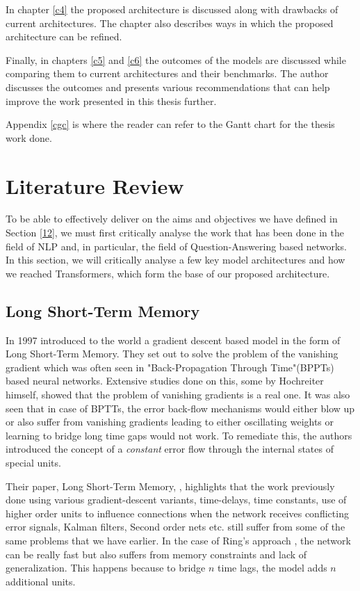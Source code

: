 \documentclass[a4paper,12pt]{report}
\begin{document}
        
        In chapter \ref{c4} the proposed architecture is discussed along with drawbacks of current architectures. The chapter also describes ways in which the proposed architecture can be refined. 
        
        Finally, in chapters \ref{c5} and \ref{c6} the outcomes of the models are discussed while comparing them to current architectures and their benchmarks. The author discusses the outcomes and presents various recommendations that can help improve the work presented in this thesis further.         
        
        Appendix \ref{cgc} is where the reader can refer to the Gantt chart for the thesis work done.

    \chapter{Literature Review}\label{c2litrev}

    To be able to effectively deliver on the aims and objectives we have defined in Section \ref{12}, we must first critically analyse the work that has been done in the field of NLP and, in particular, the field of Question-Answering based networks. In this section, we will critically analyse a few key model architectures and how we reached Transformers, which form the base of our proposed architecture.



        \section{Long Short-Term Memory}\label{22}

            In 1997 \citep{lstmoriginal} introduced to the world a gradient descent based model in the form of Long Short-Term Memory. They set out to solve the problem of the vanishing gradient which was often seen in "Back-Propagation Through Time"(BPPTs) based neural networks. Extensive studies done on this, some by Hochreiter himself, showed that the problem of vanishing gradients is a real one. It was also seen that in case of BPTTs, the error back-flow mechanisms would either blow up or also suffer from vanishing gradients leading to either oscillating weights or learning to bridge long time gaps would not work. To remediate this, the authors introduced the concept of a \textit{constant} error flow through the internal states of special units.

            Their paper, Long Short-Term Memory, \citep{lstmoriginal}, highlights that the work previously done using various gradient-descent variants, time-delays, time constants, use of higher order units to influence connections when the network receives conflicting error signals, Kalman filters, Second order nets etc. still suffer from some of the same problems that we have earlier. In the case of Ring's approach \citep{lstmRing}, the network can be really fast but also suffers from memory constraints and lack of generalization. This happens because to bridge $ n $ time lags, the model adds $ n $ additional units.
\end{document}

